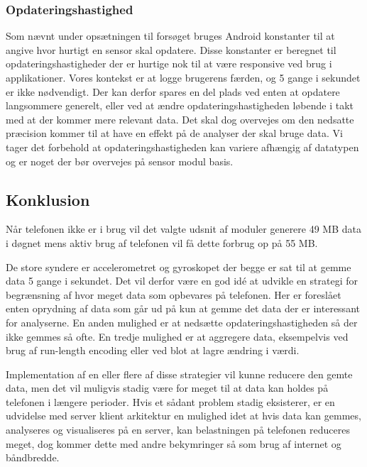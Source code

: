\subsubsection{Opdateringshastighed}
Som nævnt under opsætningen til forsøget bruges Android konstanter til at angive hvor hurtigt en sensor skal opdatere.
Disse konstanter er beregnet til opdateringshastigheder der er hurtige nok til at være responsive ved brug i applikationer.
Vores kontekst er at logge brugerens færden, og 5 gange i sekundet er ikke nødvendigt.
Der kan derfor spares en del plads ved enten at opdatere langsommere generelt, eller ved at ændre opdateringshastigheden løbende i takt med at der kommer mere relevant data.
Det skal dog overvejes om den nedsatte præcision kommer til at have en effekt på de analyser der skal bruge data.
Vi tager det forbehold at opdateringshastigheden kan variere afhængig af datatypen og er noget der bør overvejes på sensor modul basis.

\subsection{Konklusion}
Når telefonen ikke er i brug vil det valgte udsnit af moduler generere 49 MB data i døgnet mens aktiv brug af telefonen vil få dette forbrug op på 55 MB.

De store syndere er accelerometret og gyroskopet der begge er sat til at gemme data 5 gange i sekundet.
Det vil derfor være en god idé at udvikle en strategi for begrænsning af hvor meget data som opbevares på telefonen.
Her er foreslået enten oprydning af data som går ud på kun at gemme det data der er interessant for analyserne.
En anden mulighed er at nedsætte opdateringshastigheden så der ikke gemmes så ofte.
En tredje mulighed er at aggregere data, eksempelvis ved brug af run-length encoding eller ved blot at lagre ændring i værdi.

Implementation af en eller flere af disse strategier vil kunne reducere den gemte data, men det vil muligvis stadig være for meget til at data kan holdes på telefonen i længere perioder.
Hvis et sådant problem stadig eksisterer, er en udvidelse med server klient arkitektur en mulighed idet at hvis data kan gemmes, analyseres og visualiseres på en server, kan belastningen på telefonen reduceres meget, dog kommer dette med andre bekymringer så som brug af internet og båndbredde.
